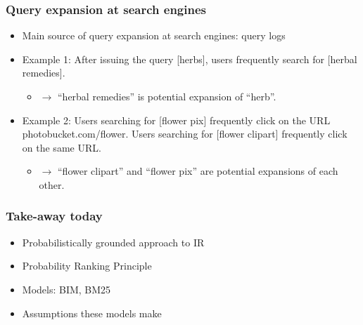 \documentclass[compress]{beamer}
\def\myblue#1{\textcolor{texblue}{#1}}
\begin{document}
\begin{frame}
\frametitle{Query expansion at search engines}
\begin{itemize}
\item Main source of query expansion at search engines:
  query logs
\item Example 1: After issuing the query [herbs], users
  frequently search for [herbal remedies].
\begin{itemize}
\item $\rightarrow$ 
``herbal remedies'' is potential expansion of ``herb''.
\end{itemize}

\item Example 2: Users searching for [flower pix]
  frequently click on the URL \myblue{photobucket.com/flower}. 
Users searching for [flower clipart]
  frequently click on the \myblue{same URL}.
\begin{itemize}
\item $\rightarrow$ 
``flower clipart'' and ``flower pix'' are potential
  expansions of each other.
\end{itemize}

\end{itemize}
\end{frame}


\begin{frame}[label=takeaway]

\frametitle{Take-away today}
\begin{itemize}
\item Probabilistically grounded approach to IR 
\item Probability Ranking Principle
\item Models: BIM, BM25
\item Assumptions these models make
\end{itemize}
\end{frame}
\end{document}
